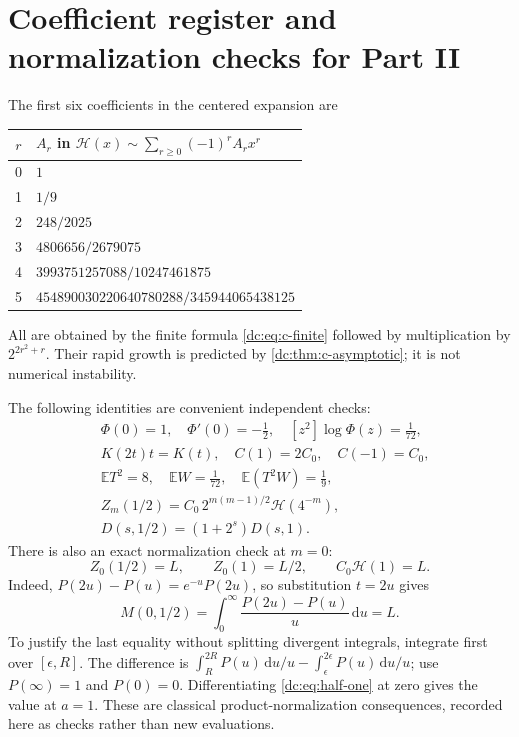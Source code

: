\documentclass[11pt,a4paper,oneside,openany]{book}
\numberwithin{equation}{chapter}
\theoremstyle{definition}
\theoremstyle{remark}
\newcommand{\E}{\mathbb E}
\newcommand{\dd}{\,\mathrm d}
\newcommand{\calH}{\mathcal H}
\begin{document}
\chapter{Coefficient register and normalization checks for Part II}
\label{dc:app:coefficients}

The first six coefficients in the centered expansion are
\begin{center}\small
\begin{tabular}{@{}cl@{}}
\toprule
$r$&$A_r$ in $\calH(x)\sim\sum_{r\ge0}(-1)^rA_rx^r$\\
\midrule
0&$1$\\[2pt]
1&$1/9$\\[2pt]
2&$248/2025$\\[2pt]
3&$4806656/2679075$\\[2pt]
4&$3993751257088/10247461875$\\[2pt]
5&$454890030220640780288/345944065438125$\\
\bottomrule
\end{tabular}
\end{center}
All are obtained by the finite formula \cref{dc:eq:c-finite} followed
by multiplication by $2^{2r^2+r}$. Their rapid growth is predicted
by \cref{dc:thm:c-asymptotic}; it is not numerical instability.

The following identities are convenient independent checks:
\begin{align*}
 &\Phi(0)=1,\quad \Phi'(0)=-\tfrac12,\quad
    [z^2]\log\Phi(z)=\tfrac1{72},\\
 &K(2t)t=K(t),\quad C(1)=2C_0,\quad C(-1)=C_0,\\
 &\E T^2=8,\quad \E W=\tfrac1{72},\quad
    \E(T^2W)=\tfrac19,\\
 &Z_m(1/2)=C_0\,2^{m(m-1)/2}\calH(4^{-m}),\\
 &D(s,1/2)=(1+2^s)D(s,1).
\end{align*}
There is also an exact normalization check at $m=0$:
\[
 Z_0(1/2)=L,\qquad Z_0(1)=L/2,\qquad C_0\calH(1)=L.
\]
Indeed, $P(2u)-P(u)=e^{-u}P(2u)$, so substitution $t=2u$ gives
\[
 M(0,1/2)=\int_0^\infty\frac{P(2u)-P(u)}u\dd u=L.
\]
To justify the last equality without splitting divergent integrals,
integrate first over $[\epsilon,R]$. The difference is
$\int_R^{2R}P(u)\dd u/u-\int_\epsilon^{2\epsilon}P(u)\dd u/u$;
use $P(\infty)=1$ and $P(0)=0$. Differentiating
\cref{dc:eq:half-one} at zero gives the value at $a=1$.
These are classical product-normalization consequences, recorded
here as checks rather than new evaluations.
\end{document}
